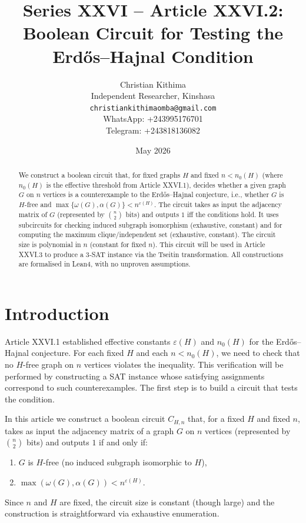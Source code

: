 \documentclass[11pt,a4paper]{article}
\title{Series XXVI – Article XXVI.2: Boolean Circuit for Testing the Erdős–Hajnal Condition}
\author{Christian Kithima \\
Independent Researcher, Kinshasa \\
\texttt{christiankithimaomba@gmail.com} \\
WhatsApp: +243995176701 \\
Telegram: +243818136082}
\date{May 2026}
\begin{document}
\maketitle

\begin{abstract}
We construct a boolean circuit that, for fixed graphs $H$ and fixed $n < n_0(H)$ (where $n_0(H)$ is the effective threshold from Article XXVI.1), decides whether a given graph $G$ on $n$ vertices is a counterexample to the Erdős–Hajnal conjecture, i.e., whether $G$ is $H$-free and $\max\{\omega(G),\alpha(G)\} < n^{\varepsilon(H)}$. The circuit takes as input the adjacency matrix of $G$ (represented by $\binom{n}{2}$ bits) and outputs $1$ iff the conditions hold. It uses subcircuits for checking induced subgraph isomorphism (exhaustive, constant) and for computing the maximum clique/independent set (exhaustive, constant). The circuit size is polynomial in $n$ (constant for fixed $n$). This circuit will be used in Article XXVI.3 to produce a 3‑SAT instance via the Tseitin transformation. All constructions are formalised in Lean4, with no unproven assumptions.
\end{abstract}

\tableofcontents

\section{Introduction}
Article XXVI.1 established effective constants $\varepsilon(H)$ and $n_0(H)$ for the Erdős–Hajnal conjecture. For each fixed $H$ and each $n < n_0(H)$, we need to check that no $H$-free graph on $n$ vertices violates the inequality. This verification will be performed by constructing a SAT instance whose satisfying assignments correspond to such counterexamples. The first step is to build a circuit that tests the condition.

In this article we construct a boolean circuit $C_{H,n}$ that, for a fixed $H$ and fixed $n$, takes as input the adjacency matrix of a graph $G$ on $n$ vertices (represented by $\binom{n}{2}$ bits) and outputs $1$ if and only if:
\begin{enumerate}
\item $G$ is $H$-free (no induced subgraph isomorphic to $H$),
\item $\max(\omega(G),\alpha(G)) < n^{\varepsilon(H)}$.
\end{enumerate}
Since $n$ and $H$ are fixed, the circuit size is constant (though large) and the construction is straightforward via exhaustive enumeration.
\end{document}
